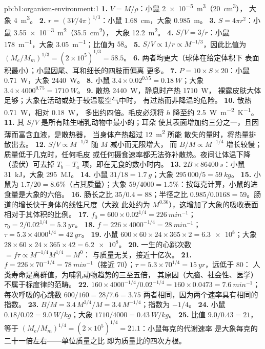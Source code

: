 \begin{solution}{pb:b1:organism-environment:1}
\textbf{1.} $V = M/\rho$：小鼠 \qty{2e-5}{m^3}（\qty{20}{cm^3}），
大象 \qty{4}{m^3}。
\textbf{2.} $r = (3V/4\pi)^{1/3}$：小鼠 \qty{1.68}{cm}，大象
\qty{0.985}{m}。
\textbf{3.} $S = 4\pi r^2$：小鼠 \qty{3.55e-3}{m^2}（\qty{35.5}{cm^2}），
大象 \qty{12.2}{m^2}。
\textbf{4.} $S/V = 3/r$：小鼠 \qty{178}{m^{-1}}，大象
\qty{3.05}{m^{-1}}；比值为 $58$。
\textbf{5.} $S/V \propto 1/r \propto M^{-1/3}$，因此比值为
$(M_e/M_m)^{1/3} = (2\times 10^5)^{1/3} = 58.5$。
\textbf{6.} 两者均更大（球体在给定体积下
表面积最小）；小鼠因尾、耳和细长的四肢而偏离
更多。
\textbf{7.} $P = 10\times S\times 20$：小鼠 \qty{0.71}{W}，大象
\qty{2440}{W}。
\textbf{8.} 小鼠 $3.4\times 0.02^{0.75} = \qty{0.18}{W}$；大象
$3.4\times 4000^{0.75} = \qty{1710}{W}$。
\textbf{9.} 散热 \qty{2440}{W}，静息时产热 \qty{1710}{W}，
裸露皮肤大体足够；大象在活动或处于较温暖空气中时，
有过热而非降温的危险。
\textbf{10.} 散热 \qty{0.71}{W}，相对 \qty{0.18}{W}，
多出约四倍。毛皮必须将 $h$ 降至约 \qty{2.5}{W.m^{-2}.K^{-1}}。
\textbf{11.} 其 $S/V$ 是所有陆生哺乳动物中最小的；耳朵
使其表面增加约三分之一，且因薄而富含血液，是散热器，
当身体产热超过 \qty{12}{m^2} 所能
散失的量时，将热量排散出去。
\textbf{12.} $S/V \propto M^{-1/3}$ 随 $M$ 减小而无限增大，
而 $B/M \propto M^{-1/4}$ 增长较慢；质量低于几克时，任何毛皮
或任何摄食速率都无法弥补散热。夜间让体温下降
（蛰伏）可去掉 $T_b - T_a$ 项，即在无食的数小时内。
\textbf{13.} $2B\times\qty{86400}{s}$：小鼠 \qty{31}{kJ}，大象
\qty{295}{MJ}。
\textbf{14.} 小鼠 $31/18 = \qty{1.7}{g}$；大象
$295\,000/5 = \qty{59}{kg}$。
\textbf{15.} 小鼠为 $1.7/20 = 8.6\%$（占其质量）；大象 $59/4000 =
1.5\%$：按每克计算，小鼠的进食量是大象的六倍。
\textbf{16.} 肠长之比 $35/0.4 = 88$；半径之比 $0.985/0.0168
= 59$。肠道的增长快于身体的线性尺度（大致
此处约为 $M^{0.36}$），这增加了大象的吸收表面
相对于其体积的比例。
\textbf{17.} $f_0 = 600\times 0.02^{1/4} = \qty{226}{min^{-1}}$；
$\tau_0 = 2/0.02^{1/4} = \qty{5.3}{yr}$。
\textbf{18.} $f = 226\times 4000^{-1/4} = \qty{28}{min^{-1}}$；$\tau =
5.3\times 4000^{1/4} = \qty{42}{yr}$。
\textbf{19.} 小鼠 $600\times 60\times 24\times 365\times 2 =
\num{6.3e8}$；大象 $28\times 60\times 24\times 365\times 42 =
\num{6.2e8}$。
\textbf{20.} 一生的心跳次数 $= f\tau \propto M^{-1/4}M^{1/4} = M^0$：
与质量无关，接近十亿次。
\textbf{21.} $f = 226\times 70^{-1/4} = \qty{78}{min^{-1}}$（接近
70）；$\tau = 5.3\times 70^{1/4} = \qty{15}{yr}$，远低于 80：
人类寿命是离群值，为哺乳动物趋势的三至五倍，
其原因（大脑、社会性、医学）不属于标度律的范畴。
\textbf{22.} $160\times 4000^{-1/4}/0.02^{-1/4} = 160\times 0.0473 =
\qty{7.6}{min^{-1}}$；每次呼吸的心跳数 $600/160 = 28/7.6 = 3.75$
两者相同，因为两个速率具有相同的指数。
\textbf{23.} $B/M = 3.4\,M^{3/4}/M = 3.4\,M^{-1/4}$；指数为 $-1/4$。
\textbf{24.} 小鼠 $0.18/0.02 = \qty{9.0}{W/kg}$；大象 $1710/4000 =
\qty{0.43}{W/kg}$。
\textbf{25.} 比值 $9.0/0.43 = 21$，等于 $(M_e/M_m)^{1/4} =
(2\times 10^5)^{1/4} = 21.1$：小鼠每克的代谢速率
是大象每克的二十一倍左右——单位质量之比
即为质量比的四次方根。
\end{solution}
